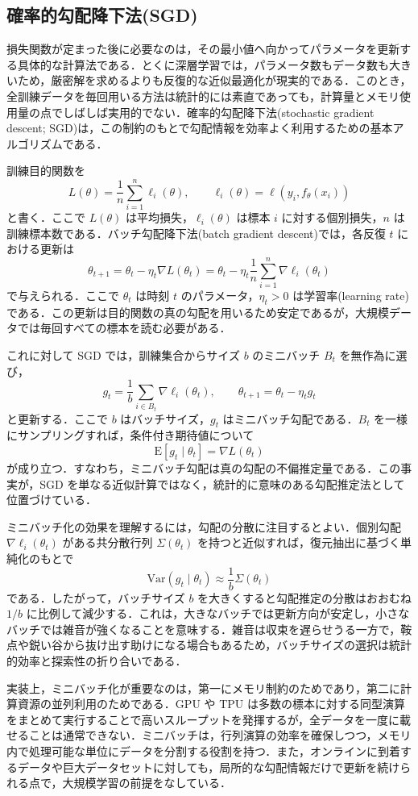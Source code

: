 \subsection{確率的勾配降下法(SGD)}
損失関数が定まった後に必要なのは，その最小値へ向かってパラメータを更新する具体的な計算法である．とくに深層学習では，パラメータ数もデータ数も大きいため，厳密解を求めるよりも反復的な近似最適化が現実的である．このとき，全訓練データを毎回用いる方法は統計的には素直であっても，計算量とメモリ使用量の点でしばしば実用的でない．確率的勾配降下法(stochastic gradient descent; SGD)は，この制約のもとで勾配情報を効率よく利用するための基本アルゴリズムである．

訓練目的関数を
\[
L(\theta)=\frac{1}{n}\sum_{i=1}^n \ell_i(\theta),
\qquad
\ell_i(\theta)=\ell(y_i,f_\theta(x_i))
\]
と書く．ここで $L(\theta)$ は平均損失，$\ell_i(\theta)$ は標本 $i$ に対する個別損失，$n$ は訓練標本数である．バッチ勾配降下法(batch gradient descent)では，各反復 $t$ における更新は
\[
\theta_{t+1}
= \theta_t - \eta_t \nabla L(\theta_t)
= \theta_t - \eta_t \frac{1}{n}\sum_{i=1}^n \nabla \ell_i(\theta_t)
\]
で与えられる．ここで $\theta_t$ は時刻 $t$ のパラメータ，$\eta_t>0$ は学習率(learning rate)である．この更新は目的関数の真の勾配を用いるため安定であるが，大規模データでは毎回すべての標本を読む必要がある．

これに対して SGD では，訓練集合からサイズ $b$ のミニバッチ $B_t$ を無作為に選び，
\[
g_t
= \frac{1}{b}\sum_{i\in B_t}\nabla \ell_i(\theta_t),
\qquad
\theta_{t+1}=\theta_t-\eta_t g_t
\]
と更新する．ここで $b$ はバッチサイズ，$g_t$ はミニバッチ勾配である．$B_t$ を一様にサンプリングすれば，条件付き期待値について
\[
\mathrm{E}[g_t\mid \theta_t] = \nabla L(\theta_t)
\]
が成り立つ．すなわち，ミニバッチ勾配は真の勾配の不偏推定量である．この事実が，SGD を単なる近似計算ではなく，統計的に意味のある勾配推定法として位置づけている．

ミニバッチ化の効果を理解するには，勾配の分散に注目するとよい．個別勾配 $\nabla \ell_i(\theta_t)$ がある共分散行列 $\Sigma(\theta_t)$ を持つと近似すれば，復元抽出に基づく単純化のもとで
\[
\mathrm{Var}(g_t\mid \theta_t)\approx \frac{1}{b}\Sigma(\theta_t)
\]
である．したがって，バッチサイズ $b$ を大きくすると勾配推定の分散はおおむね $1/b$ に比例して減少する．これは，大きなバッチでは更新方向が安定し，小さなバッチでは雑音が強くなることを意味する．雑音は収束を遅らせうる一方で，鞍点や鋭い谷から抜け出す助けになる場合もあるため，バッチサイズの選択は統計的効率と探索性の折り合いである．

実装上，ミニバッチ化が重要なのは，第一にメモリ制約のためであり，第二に計算資源の並列利用のためである．GPU や TPU は多数の標本に対する同型演算をまとめて実行することで高いスループットを発揮するが，全データを一度に載せることは通常できない．ミニバッチは，行列演算の効率を確保しつつ，メモリ内で処理可能な単位にデータを分割する役割を持つ．また，オンラインに到着するデータや巨大データセットに対しても，局所的な勾配情報だけで更新を続けられる点で，大規模学習の前提をなしている．


